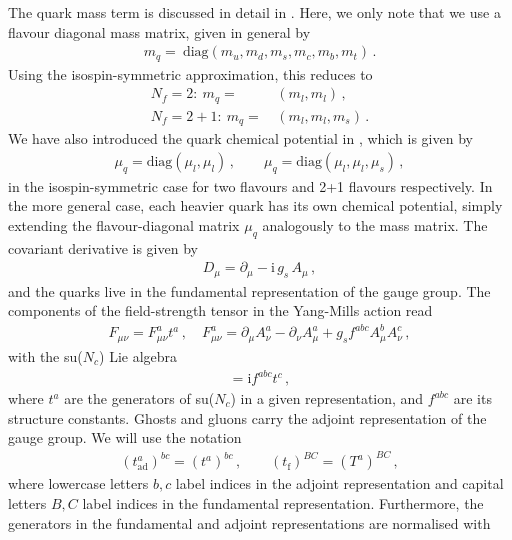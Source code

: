 \documentclass[aps,twocolumn,prd,superscriptaddress]{revtex4-2}
\begin{document}
The quark mass term is discussed in detail in . Here, we only note that we use a flavour diagonal mass matrix, given in general by %
%
\begin{align} 
	m_q=~\textrm{diag}(m_u,m_d,m_s,m_c,m_b,m_t)\,.
\label{eq:mqall}
\end{align} 
%
Using the isospin-symmetric approximation, this reduces to
%
\begin{align} \nonumber 
N_f=2:\ m_q=&\, (m_l,m_l)\,,\\[1ex] 
N_f=2+1:\ m_q=&\,(m_l,m_l,m_s)\,. 
\end{align} 
%
We have also introduced the quark chemical potential in , which is given by 
%
\begin{align}
\mu_q=\textrm{diag}(\mu_l,\mu_l)\,,\qquad \mu_q=\textrm{diag}(\mu_l,\mu_l,\mu_s)\,, 
\label{eq:muq}
\end{align}
%
in the isospin-symmetric case for two flavours and 2+1 flavours respectively. In the more general case, each heavier quark has its own chemical potential, simply extending the flavour-diagonal matrix $\mu_q$ analogously to the mass matrix. The covariant derivative is given by
%
\begin{align}
	D_\mu = \partial_\mu - {\textrm{i}}\,g_s\,A_\mu\,,
	\label{eq:CovDer}
\end{align}
%
and the quarks live in the fundamental representation of the gauge group. 
The components of the field-strength tensor in the Yang-Mills action read
%
\begin{align}
	F_{\mu\nu}=F^a_{\mu\nu}t^a \,,\quad 	F_{\mu\nu}^a =\partial_\mu A^a_\nu -\partial_\nu A_\mu^a +g_s f^{abc} A_\mu^b A^c_\nu\,,
	\label{eq:Fstrength}
\end{align}
%
with the su($N_c$) Lie algebra
%
\begin{align}
	[t^a\,,\,t^b] = {\textrm{i}} f^{abc} t^c\,, 
	\label{eq:LieAlg}
\end{align}
%
where $t^a $ are the generators of su($N_c$) in a given representation, and $f^{ abc}$ are its structure constants. Ghosts and gluons carry the adjoint representation of the gauge group. We will use the notation 
%
\begin{align}
	(t_\textrm{ad}^a)^{bc} = ( t^a)^{bc} \,,\qquad ( t_\textrm{f})^{BC} = (T^a)^{BC} \,,
\end{align}
%
where lowercase letters $b,c$ label indices in the adjoint representation and capital letters $B,C$ label indices in the fundamental representation. 
Furthermore, the generators in the fundamental and adjoint representations are normalised with 
\end{document}
